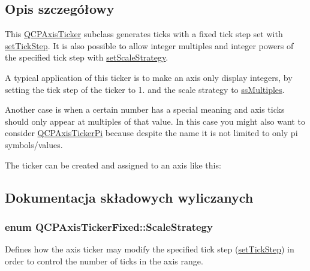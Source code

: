\subsection{Opis szczegółowy}


This \hyperlink{class_q_c_p_axis_ticker}{Q\+C\+P\+Axis\+Ticker} subclass generates ticks with a fixed tick step set with \hyperlink{class_q_c_p_axis_ticker_fixed_a4bc83d85a4f81d4abdd3fa5042d7b833}{set\+Tick\+Step}. It is also possible to allow integer multiples and integer powers of the specified tick step with \hyperlink{class_q_c_p_axis_ticker_fixed_acbc7c9bcd80b3dc3edee5f0519d301f6}{set\+Scale\+Strategy}.

A typical application of this ticker is to make an axis only display integers, by setting the tick step of the ticker to 1. and the scale strategy to \hyperlink{class_q_c_p_axis_ticker_fixed_a15b3d38b935d404b1311eb85cfb6a439a22f651785f6412645837421896561104}{ss\+Multiples}.

Another case is when a certain number has a special meaning and axis ticks should only appear at multiples of that value. In this case you might also want to consider \hyperlink{class_q_c_p_axis_ticker_pi}{Q\+C\+P\+Axis\+Ticker\+Pi} because despite the name it is not limited to only pi symbols/values.

The ticker can be created and assigned to an axis like this\+: 
\begin{DoxyCodeInclude}
\end{DoxyCodeInclude}


\subsection{Dokumentacja składowych wyliczanych}
\subsubsection[{\texorpdfstring{Scale\+Strategy}{ScaleStrategy}}]{\setlength{\rightskip}{0pt plus 5cm}enum {\bf Q\+C\+P\+Axis\+Ticker\+Fixed\+::\+Scale\+Strategy}}\hypertarget{class_q_c_p_axis_ticker_fixed_a15b3d38b935d404b1311eb85cfb6a439}{}\label{class_q_c_p_axis_ticker_fixed_a15b3d38b935d404b1311eb85cfb6a439}
Defines how the axis ticker may modify the specified tick step (\hyperlink{class_q_c_p_axis_ticker_fixed_a4bc83d85a4f81d4abdd3fa5042d7b833}{set\+Tick\+Step}) in order to control the number of ticks in the axis range.

